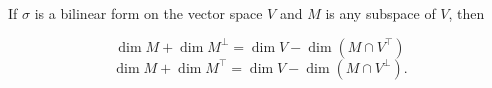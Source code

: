 If $\sigma$ is a bilinear form on the vector space $V$ and $M$ is any subspace of $V$, then

$$\dim M + \dim M^{\perp} = \dim V - \dim (M \cap V^{\top})$$
$$\dim M + \dim M^{\top} = \dim V - \dim (M \cap V^{\perp}).$$
